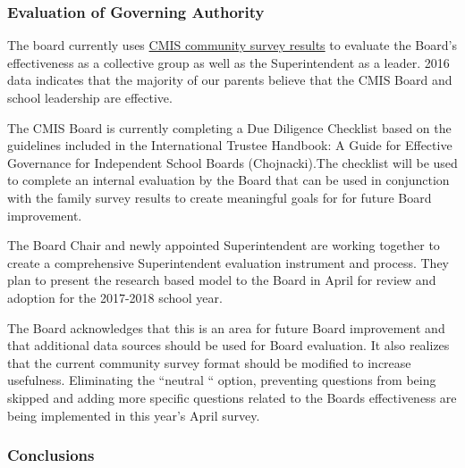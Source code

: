 \subsubsection{Evaluation of Governing Authority}



\begin{findings}
The board currently uses \href{https://docs.google.com/a/cmis.ac.th/document/d/1_otvw47y3Z-1CSjXnKhgRTauVRqPl1S6nSdmsb00O2k/edit?usp=sharing}{CMIS community survey results} to evaluate the Board’s effectiveness as a collective group as well as the Superintendent as a leader. 2016 data indicates that the majority of our parents believe that the CMIS Board and school leadership are effective.

The CMIS Board is currently completing a Due Diligence Checklist based on the guidelines included in the International Trustee Handbook: A Guide for Effective Governance for Independent School Boards (Chojnacki).The checklist will be used to complete an internal evaluation by the Board that can be used in conjunction with the family survey results to create meaningful goals for for future Board improvement.

The Board Chair and newly appointed Superintendent are working together to create a comprehensive Superintendent evaluation instrument and process. They plan to present the research based model to the Board in April for review and adoption for the 2017-2018 school year.


The Board acknowledges that this is an area for future Board improvement and that additional data sources should be used for Board evaluation. It also realizes that the current community survey format should be modified to increase usefulness. Eliminating the “neutral “ option, preventing questions from being skipped and adding more specific questions related to the Boards effectiveness are being implemented in this year’s April survey.
\end{findings}

\subsubsection{Conclusions}

